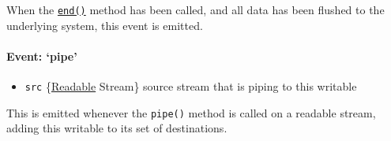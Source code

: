 When the
\hyperref[streamux5fwritableux5fendux5fchunkux5fencodingux5fcallback]{\texttt{end()}}
method has been called, and all data has been flushed to the underlying
system, this event is emitted.

\begin{Shaded}
\begin{Highlighting}[]
 \NormalTok{();}
 \NormalTok{(} 
  \NormalTok{(} \NormalTok{);}
\NormalTok{\}}
\NormalTok{(}\NormalTok{);}
\NormalTok{(}\NormalTok{, }\NormalTok{() \{}
  \NormalTok{(}\NormalTok{);}
\NormalTok{\});}
\end{Highlighting}
\end{Shaded}

\paragraph{Event: `pipe'}\label{event-pipe}

\begin{itemize}
\itemsep1pt\parskip0pt
\item
  \texttt{src}
  \{\hyperref[streamux5fclassux5fstreamux5freadable]{Readable} Stream\}
  source stream that is piping to this writable
\end{itemize}

This is emitted whenever the \texttt{pipe()} method is called on a
readable stream, adding this writable to its set of destinations.

\begin{Shaded}
\begin{Highlighting}[]
 \NormalTok{();}
 \NormalTok{();}
\NormalTok{(}\NormalTok{, }
  \NormalTok{(}\NormalTok{);}
\NormalTok{\});}
\end{Highlighting}
\end{Shaded}

